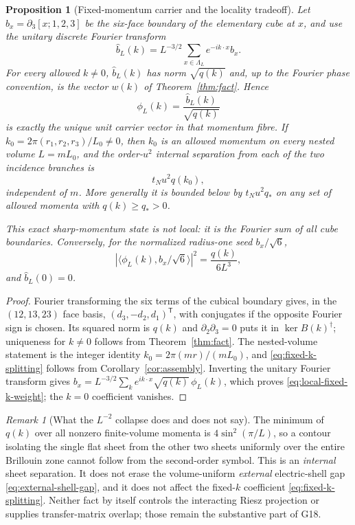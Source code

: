 \documentclass[11pt]{article}
\theoremstyle{plain}
\newtheorem{proposition}[theorem]{Proposition}
\theoremstyle{definition}
\theoremstyle{remark}
\newtheorem{remark}[theorem]{Remark}
\newcommand{\dg}{^{\dagger}}
\begin{document}
\begin{proposition}[Fixed-momentum carrier and the locality tradeoff]
\label{prop:fixed-k-carrier}
Let $b_x=\partial_3[x;1,2,3]$ be the six-face boundary of the elementary cube
at $x$, and use the unitary discrete Fourier transform
\[
 \widehat b_L(k)=L^{-3/2}\sum_{x\in\Lambda_L}e^{-ik\cdot x}b_x .
\]
For every allowed $k\ne0$, $\widehat b_L(k)$ has norm $\sqrt{q(k)}$ and,
up to the Fourier phase convention, is the vector $w(k)$ of
Theorem~\ref{thm:fact}. Hence
\[
 \phi_L(k)=\frac{\widehat b_L(k)}{\sqrt{q(k)}}
\]
is exactly the unique unit carrier vector in that momentum fibre. If
$k_0=2\pi(r_1,r_2,r_3)/L_0\ne0$, then $k_0$ is an allowed momentum on every
nested volume $L=mL_0$, and the order-$u^2$ internal separation from each of
the two incidence branches is
\begin{equation}\label{eq:fixed-k-splitting}
 t_Nu^2q(k_0),
\end{equation}
independent of $m$. More generally it is bounded below by
$t_Nu^2q_*$ on any set of allowed momenta with $q(k)\ge q_*>0$.

This exact sharp-momentum state is not local: it is the Fourier sum of all
cube boundaries. Conversely, for the normalized radius-one seed
$b_x/\sqrt6$,
\begin{equation}\label{eq:local-fixed-k-weight}
 \left|\langle\phi_L(k),b_x/\sqrt6\rangle\right|^2
 =\frac{q(k)}{6L^3},
\end{equation}
and $\widehat b_L(0)=0$.
\end{proposition}

\begin{proof}
Fourier transforming the six terms of the cubical boundary gives, in the
$(12,13,23)$ face basis, $(d_3,-d_2,d_1)^{\mathsf T}$, with conjugates if the
opposite Fourier sign is chosen. Its squared norm is $q(k)$ and
$\partial_2\partial_3=0$ puts it in $\ker B(k)\dg$; uniqueness for $k\ne0$
follows from Theorem~\ref{thm:fact}. The nested-volume statement is the
integer identity $k_0=2\pi(mr)/(mL_0)$, and
\eqref{eq:fixed-k-splitting} follows from
Corollary~\ref{cor:assembly}. Inverting the unitary Fourier transform gives
$b_x=L^{-3/2}\sum_k e^{ik\cdot x}\sqrt{q(k)}\,\phi_L(k)$, which proves
\eqref{eq:local-fixed-k-weight}; the $k=0$ coefficient vanishes.
\end{proof}

\begin{remark}[What the $L^{-2}$ collapse does and does not say]
The minimum of $q(k)$ over all nonzero finite-volume momenta is
$4\sin^2(\pi/L)$, so a contour isolating the single flat sheet from the other
two sheets uniformly over the entire Brillouin zone cannot follow from the
second-order symbol. This is an \emph{internal} sheet separation. It does not
erase the volume-uniform \emph{external} electric-shell gap
\eqref{eq:external-shell-gap}, and it does not affect the fixed-$k$ coefficient
\eqref{eq:fixed-k-splitting}. Neither fact by itself controls the interacting
Riesz projection or supplies transfer-matrix overlap; those remain the
substantive part of G18.
\end{remark}
\end{document}
